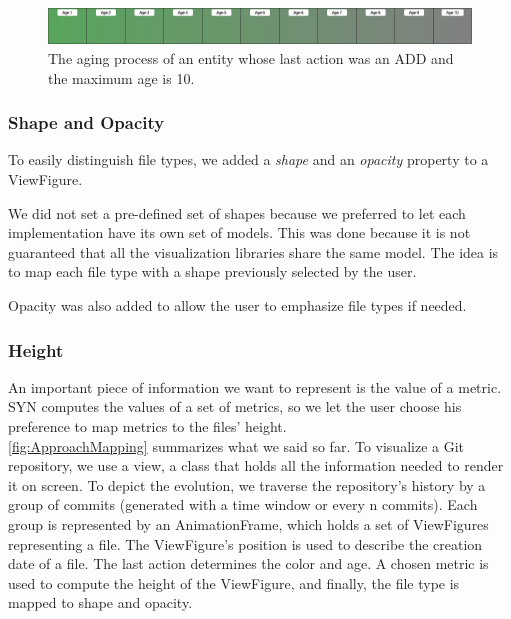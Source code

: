 \begin{figure}
    \center
    \includegraphics[width=\textwidth]{Aging.jpg}
    \caption{The aging process of an entity whose last action was an ADD and the maximum age is 10. }
    \label{fig:Aging}
\end{figure}



\subsubsection*{Shape and Opacity}
To easily distinguish file types, we added a \textit{shape} and an \textit{opacity} property to a ViewFigure.

We did not set a pre-defined set of shapes because we preferred to let each implementation have its own set of models. This was done because it is not guaranteed that all the visualization libraries share the same model. The idea is to map each file type with a shape previously selected by the user. 

Opacity was also added to allow the user to emphasize file types if needed. 


\subsubsection*{Height}
An important piece of information we want to represent is the value of a metric. SYN computes the values of a set of metrics, so we let the user choose his preference to map metrics to the files' height. \\


\autoref{fig:ApproachMapping} summarizes what we said so far. To visualize a Git repository, we use a view, a class that holds all the information needed to render it on screen. To depict the evolution, we traverse the repository's history by a group of commits (generated with a time window or every n commits). Each group is represented by an AnimationFrame, which holds a set of ViewFigures representing a file. The ViewFigure's position is used to describe the creation date of a file. The last action determines the color and age. A chosen metric is used to compute the height of the ViewFigure, and finally, the file type is mapped to shape and opacity. 


